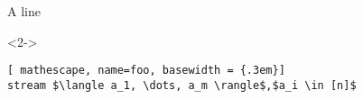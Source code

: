 \documentclass{beamer}
\begin{document}
\begin{frame}[fragile]
A line
\begin{visibleenv}<2->
\begin{tcolorbox}[top=0pt, left=5pt,right=5pt, colback=blue!5!white, text height=4.8cm]
\begin{lstlisting}[ mathescape, name=foo, basewidth = {.3em}]
stream $\langle a_1, \dots, a_m \rangle$,$a_i \in [n]$
\end{lstlisting}
\end{tcolorbox}
\end{visibleenv}%
\end{frame}
\end{document}
